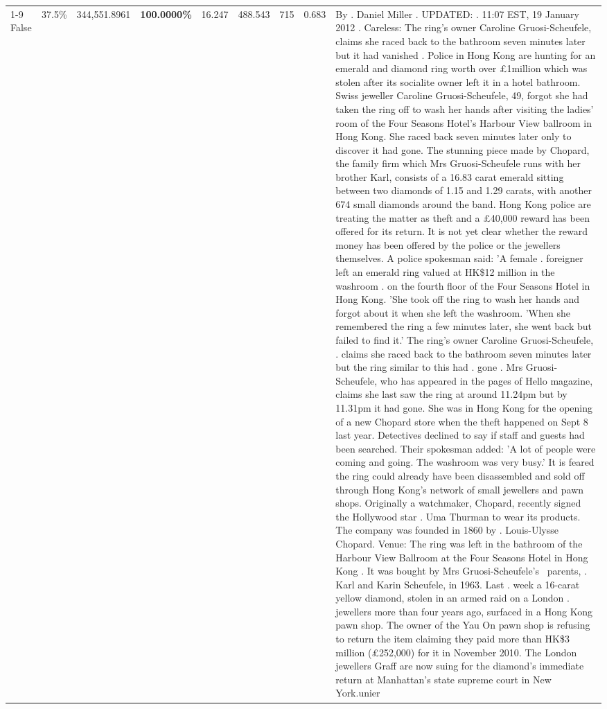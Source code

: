 \begin{table}[H]
\begin{tabular}{lllrlllll}
\cline{1-9}
False & 37.5\% & 344,551.8961 & \bfseries \color{red} 100.0000\% & 16.247 & 488.543 & 715 & 0.683 & By . Daniel Miller . UPDATED: . 11:07 EST, 19 January 2012 . Careless: The ring's owner Caroline Gruosi-Scheufele, claims she raced back to the bathroom seven minutes later but it had vanished . Police in Hong Kong are hunting for an emerald and diamond ring worth over £1million which was stolen after its socialite owner left it in a hotel bathroom. Swiss jeweller Caroline Gruosi-Scheufele, 49, forgot she had taken the ring off to wash her hands after visiting the ladies' room of the Four Seasons Hotel's Harbour View ballroom in Hong Kong. She raced back seven minutes later only to discover it had gone. The stunning piece made by Chopard, the family firm which Mrs Gruosi-Scheufele runs with her brother Karl, consists of a 16.83 carat emerald sitting between two diamonds of 1.15 and 1.29 carats, with another 674 small diamonds around the band. Hong Kong police are treating the matter as theft and a £40,000 reward has been offered for its return. It is not yet clear whether the reward money has been offered by the police or the jewellers themselves. A police spokesman said: 'A female . foreigner left an emerald ring valued at HK\$12 million in the washroom . on the fourth floor of the Four Seasons Hotel in Hong Kong. 'She took off the ring to wash her hands and forgot about it when she left the washroom. 'When she remembered the ring a few minutes later, she went back but failed to find it.' The ring's owner Caroline Gruosi-Scheufele, . claims she raced back to the bathroom seven minutes later but the ring similar to this had . gone . Mrs Gruosi-Scheufele, who has appeared in the pages of Hello magazine, claims she last saw the ring at around 11.24pm but by 11.31pm it had gone. She was in Hong Kong for the opening of a new Chopard store when the theft happened on Sept 8 last year. Detectives declined to say if staff and guests had been searched. Their spokesman added: 'A lot of people were coming and going. The washroom was very busy.' It is feared the ring could already have been disassembled and sold off through Hong Kong's network of small jewellers and pawn shops. Originally a watchmaker, Chopard, recently signed the Hollywood star . Uma Thurman to wear its products. The company was founded in 1860 by . Louis-Ulysse Chopard. Venue: The ring was left in the bathroom of the Harbour View Ballroom at the Four Seasons Hotel in Hong Kong . It was bought by Mrs Gruosi-Scheufele's  parents, . Karl and Karin Scheufele, in 1963. Last . week a 16-carat yellow diamond, stolen in an armed raid on a London . jewellers more than four years ago, surfaced in a Hong Kong pawn shop. The owner of the Yau On pawn shop is refusing to return the item claiming they paid more than HK\$3 million (£252,000) for it in November 2010. The London jewellers Graff are now suing for the diamond’s immediate return at Manhattan’s state supreme court in New York.unier \\

\end{tabular}
\end{table}
